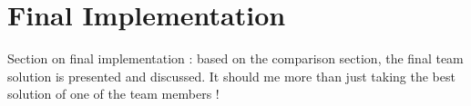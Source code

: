 \documentclass[final]{article}
\begin{document}
\section{Final Implementation}
Section on final implementation : based on the comparison section, the final team solution is presented and discussed. It should me more than just taking the best solution of one of the team members !
\end{document}
